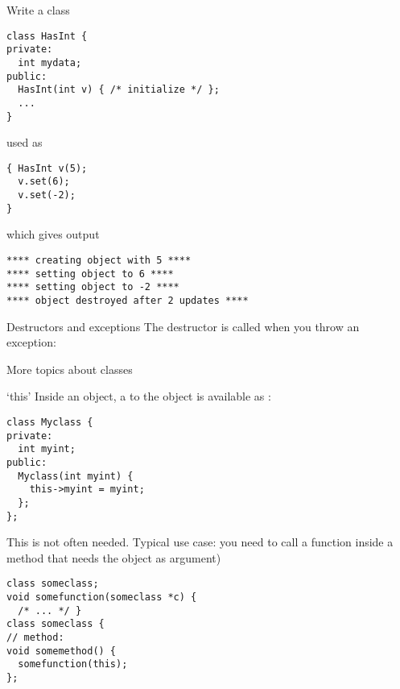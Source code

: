 \begin{exercise}
  \label{ex:destruct-trace}
  Write a class
\begin{verbatim}
class HasInt {
private:
  int mydata;
public:
  HasInt(int v) { /* initialize */ };
  ...
}
\end{verbatim}
used as
\begin{verbatim}
{ HasInt v(5);
  v.set(6);
  v.set(-2);
}
\end{verbatim}
which gives output
\begin{verbatim}
**** creating object with 5 ****
**** setting object to 6 ****
**** setting object to -2 ****
**** object destroyed after 2 updates ****
\end{verbatim}
\end{exercise}

\begin{block}{Destructors and exceptions}
  \label{sl:exceptobj}
  The destructor is called when you throw an exception:
\end{block}



 {More topics about classes}

\begin{block}{`this'}
  \label{sl:class-this}
  Inside an object, a  to the object is available
  as :
\begin{verbatim}
class Myclass {
private:
  int myint;
public:
  Myclass(int myint) {
    this->myint = myint;
  };
};
\end{verbatim}
This is not often needed. Typical use case:
you need to call a function inside a method that needs the object as argument)
\begin{verbatim}
class someclass;
void somefunction(someclass *c) {
  /* ... */ }
class someclass {
// method:
void somemethod() {
  somefunction(this);
};
\end{verbatim}
\end{block}


